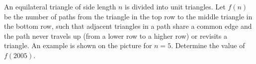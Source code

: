 An equilateral triangle of side length $ n$ is divided into unit triangles. Let $ f(n)$ be the number of paths from the triangle in the top row to the middle triangle in the bottom row, such that adjacent triangles in a path share a common edge and the path never travels up (from a lower row to a higher row) or revisits a triangle. An example is shown on the picture for $ n = 5$. Determine the value of $ f(2005)$.